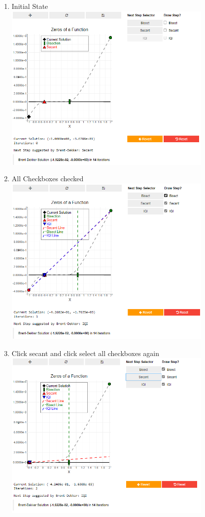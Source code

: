\begin{enumerate}
    \item Initial State\\
    \includegraphics[width=0.8\textwidth]{Include/Images/Thesis/Documentation/Visualizers/NonLinear/Example 2/Example 2 - 00 - Initial State.png}
    \item All Checkboxes checked\\
    \includegraphics[width=0.8\textwidth]{Include/Images/Thesis/Documentation/Visualizers/NonLinear/Example 2/Example 2 - 01 - All Check Boxes.png}
    \item Click secant and click select all checkboxes again\\
    \includegraphics[width=0.8\textwidth]{Include/Images/Thesis/Documentation/Visualizers/NonLinear/Example 2/Example 2 - 02 - Click secant and All Check Boxes.png}

\end{enumerate}
